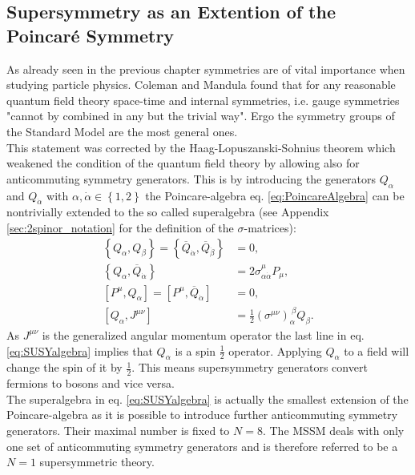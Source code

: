 \subsection{Supersymmetry as an Extention of the Poincaré Symmetry}\label{sec:SUSYalgebra}
As already seen in the previous chapter symmetries are of vital importance when studying particle physics. Coleman and Mandula \cite{Coleman:1967ad} found that for any reasonable quantum field theory space-time and internal symmetries, i.e. gauge symmetries "cannot by combined in any but the trivial way"\cite{Pelc:1996vg}. Ergo the symmetry groups of the Standard Model are the most general ones.\\
This statement was corrected by the Haag-Lopuszanski-Sohnius theorem \cite{Haag:1974qh} which weakened the condition of the quantum field theory by allowing also for anticommuting symmetry generators. This is by introducing the generators $Q_\alpha$ and $Q_{\dot{\alpha}}$ with $\alpha, \dot{\alpha} \in \left\{ 1,2 \right\}$ the Poincare-algebra eq. \ref{eq:PoincareAlgebra} can be nontrivially extended to the so called superalgebra (see Appendix \ref{sec:2spinor_notation} for the definition of the $\sigma$-matrices):
\begin{align}
\left\{Q_\alpha,Q_\beta\right\} = \left\{\overline{Q}_{\dot{\alpha}},\overline{Q}_{\dot{\beta}}\right\} &= 0,  \nonumber\\
\left\{Q_\alpha,\overline{Q}_{\dot{\alpha}}\right\} &= 2\sigma^\mu_{\alpha\dot{\alpha}} P_\mu, \nonumber\\
[P^\mu,Q_\alpha] = [P^\mu,\overline{Q}_{\dot{\alpha}}] &= 0, \nonumber \\
[Q_\alpha, J^{\mu\nu}] &= \frac{1}{2} (\sigma^{\mu\nu})_\alpha^{\ \beta} Q_\beta.\label{eq:SUSYalgebra}
\end{align}
As $J^{\mu\nu}$ is the generalized angular momentum operator the last line in eq. \ref{eq:SUSYalgebra} implies that $Q_\alpha$ is a spin $\frac{1}{2}$ operator. Applying $Q_\alpha$ to a field will change the spin of it by $\frac{1}{2}$. This means supersymmetry generators convert fermions to bosons and vice versa.\\
The superalgebra in eq. \ref{eq:SUSYalgebra} is actually the smallest extension of the Poincare-algebra as it is possible to introduce further anticommuting symmetry generators. Their maximal number is fixed to $N = 8$. The MSSM deals with only one set of anticommuting symmetry generators and is therefore referred to be a $N = 1$ supersymmetric theory.\\
